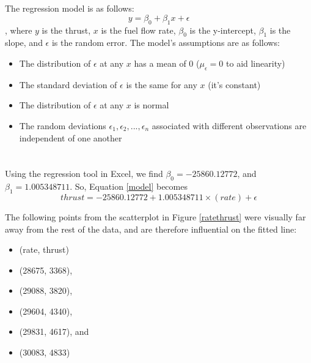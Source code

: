 \documentclass[letterpaper]{article}
\begin{document}
\section{}

The regression model is as follows:
\begin{equation}
 y = \beta_0 + \beta_1 x + \epsilon
 \label{model}
\end{equation}
, where $y$ is the thrust, $x$ is the fuel flow rate, $\beta_0$ is the y-intercept, $\beta_1$
is the slope, and $\epsilon$ is the random error.
The model's assumptions are as follows:
\begin{itemize}
 \item The distribution of $\epsilon$ at any $x$ has a mean of 0 ($\mu_\epsilon=0$ to aid linearity)
 \item The standard deviation of $\epsilon$ is the same for any $x$ (it's constant)
 \item The distribution of $\epsilon$ at any $x$ is normal
 \item The random deviations $\epsilon_1, \epsilon_2, ..., \epsilon_n$ associated with different observations are independent of one another
\end{itemize}

\section{}

\subsection{}

Using the regression tool in Excel, we find $\beta_0=-25860.12772$, and
$\beta_1=1.005348711$.
So, Equation \ref{model} becomes
$$ thrust = -25860.12772 + 1.005348711 \times (rate) + \epsilon$$

The following points from the scatterplot in Figure \ref{ratethrust} were visually far
away from the rest of the data, and are therefore influential on the fitted line:
\begin{itemize}
 \item[] (rate, thrust)
 \item[] (28675, 3368),
 \item[] (29088, 3820),
 \item[] (29604, 4340),
 \item[] (29831, 4617), and
 \item[] (30083, 4833)
\end{itemize}
\end{document}
